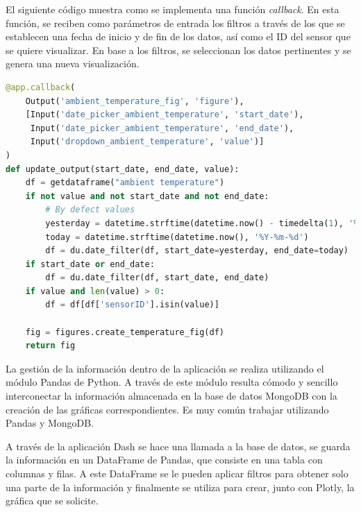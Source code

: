 \documentclass[a4paper, 12pt, oneside]{book}
\begin{document}
El siguiente código muestra como se implementa una función \textit{callback}. En esta función, se reciben como parámetros de entrada los filtros a través de los que se establecen una fecha de inicio y de fin de los datos, así como el ID del sensor que se quiere visualizar.  En base a los filtros, se seleccionan los datos pertinentes y se genera una nueva visualización.

\begin{lstlisting}[language=Python]
@app.callback(
    Output('ambient_temperature_fig', 'figure'),
    [Input('date_picker_ambient_temperature', 'start_date'),
     Input('date_picker_ambient_temperature', 'end_date'),
     Input('dropdown_ambient_temperature', 'value')]
)
def update_output(start_date, end_date, value):
    df = getdataframe("ambient temperature")
    if not value and not start_date and not end_date:
        # By defect values
        yesterday = datetime.strftime(datetime.now() - timedelta(1), '%Y-%m-%d')
        today = datetime.strftime(datetime.now(), '%Y-%m-%d')
        df = du.date_filter(df, start_date=yesterday, end_date=today)
    if start_date or end_date:
        df = du.date_filter(df, start_date, end_date)
    if value and len(value) > 0:
        df = df[df['sensorID'].isin(value)]

    fig = figures.create_temperature_fig(df)
    return fig
\end{lstlisting}

La gestión de la información dentro de la aplicación se realiza utilizando el módulo Pandas de Python. A través de este módulo resulta cómodo y sencillo interconectar la información almacenada en la base de datos MongoDB con la creación de las gráficas correspondientes.
Es muy común trabajar utilizando Pandas y MongoDB. 

A través de la aplicación Dash se hace una llamada a la base de datos, se guarda la información en un DataFrame de Pandas, que  consiste en una tabla con columnas y filas. A este DataFrame se le pueden aplicar filtros para obtener solo una parte de la información y finalmente se utiliza para crear, junto con Plotly, la gráfica que se solicite.
%
%
%
\end{document}
